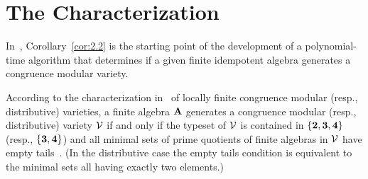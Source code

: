 \section{The Characterization}
\label{sec:freese-valer-lemm}
In~\cite{Freese:2009}, Corollary~\ref{cor:2.2} is the starting point of the
development of a polynomial-time algorithm that determines if a given finite
idempotent algebra generates a congruence modular variety.


According to the characterization
in~\cite[Chapter~8]{HM:1988} of locally finite congruence modular (resp.,
distributive) varieties, a finite algebra $\mathbf{A}$ generates a congruence modular
(resp., distributive) variety $\mathcal{V}$ if and only if the typeset
of $\mathcal{V}$ is
contained in $\{\textbf{2}, \textbf{3}, \textbf{4}\}$ (resp., $\{\textbf{3}, \textbf{4}\}$)
and all minimal sets of prime
quotients of finite algebras in $\mathcal{V}$ have empty
tails~\cite[Def.~2.15]{HM:1988}. (In the distributive
case the empty tails condition is equivalent to the minimal sets all having exactly
two elements.)

